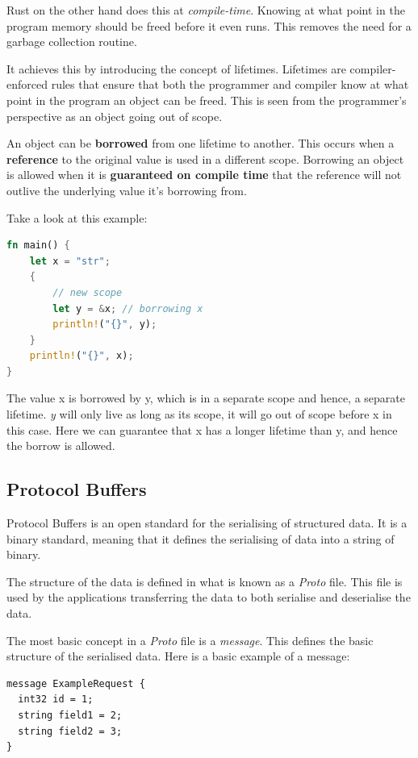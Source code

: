 \documentclass[a4paper,12pt]{report}
\begin{document}
Rust on the other hand does this at \textit{compile-time}. Knowing at what point in the program memory should be freed before it even runs. This removes the need for a garbage collection routine.

It achieves this by introducing the concept of lifetimes. Lifetimes are compiler-enforced rules that ensure that both the programmer and compiler know at what point in the program an object can be freed. 
This is seen from the programmer's perspective as an object going out of scope. 

An object can be \textbf{borrowed} from one lifetime to another. This occurs when a \textbf{reference} to the original value is used in a different scope.
Borrowing an object is allowed when it is \textbf{guaranteed on compile time} that the reference will not outlive the underlying value it's borrowing from.

Take a look at this example:

\begin{lstlisting}[language=Rust]
fn main() {
    let x = "str";
    {
        // new scope
        let y = &x; // borrowing x
        println!("{}", y);
    }
    println!("{}", x);
}
\end{lstlisting}

The value x is borrowed by y, which is in a separate scope and hence, a separate lifetime.
\textit{y} will only live as long as its scope, it will go out of scope before x in this case.
Here we can guarantee that x has a longer lifetime than y, and hence the borrow is allowed.


\subsection{Protocol Buffers}
\label{sec:protobufs}
Protocol Buffers \cite{protobuf} is an open standard for the serialising of structured data.
It is a binary standard, meaning that it defines the serialising of data into a string of binary.

The structure of the data is defined in what is known as a \textit{Proto} file. This file is used by the applications transferring the data to both serialise and deserialise the data. 

The most basic concept in a \textit{Proto} file is a \textit{message}. This defines the basic structure of the serialised data. Here is a basic example of a message:

\begin{lstlisting}
message ExampleRequest {
  int32 id = 1;
  string field1 = 2;
  string field2 = 3;
}
\end{lstlisting}
\end{document}

